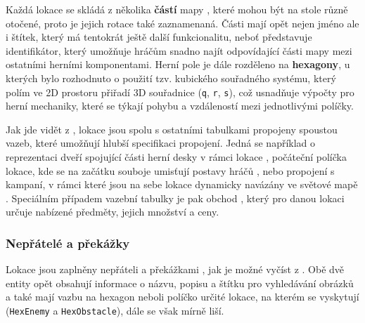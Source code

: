 Každá lokace se skládá z několika \textbf{částí} mapy , které mohou být na stole různě otočené, proto je jejich rotace  také zaznamenaná. Části mají opět nejen jméno ale i štítek, který má tentokrát ještě další funkcionalitu, neboť představuje identifikátor, který umožňuje hráčům snadno najít odpovídající části mapy mezi ostatními herními komponentami. Herní pole je dále rozděleno na \textbf{hexagony}, u kterých bylo rozhodnuto o použití tzv. kubického souřadného systému, který polím ve 2D prostoru přiřadí 3D souřadnice (\texttt{q}, \texttt{r}, \texttt{s}), což usnadňuje výpočty pro herní mechaniky, které se týkají pohybu a vzdáleností mezi jednotlivými políčky.

Jak jde vidět z , lokace jsou spolu s ostatními tabulkami propojeny spoustou vazeb, které umožňují hlubší specifikaci propojení. Jedná se například o reprezentaci dveří spojující části herní desky v rámci lokace , počáteční políčka lokace, kde se na začátku souboje umisťují postavy hráčů , nebo propojení s kampaní, v rámci které jsou na sebe lokace dynamicky navázány ve světové mapě . Speciálním případem vazební tabulky je pak obchod , který pro danou lokaci určuje nabízené předměty, jejich množství a ceny.

\subsubsection*{Nepřátelé a překážky}
\label{subsubsec:schema_enemy_obstacle}

Lokace jsou zaplněny nepřáteli  a překážkami , jak je možné vyčíst z . Obě dvě entity opět obsahují informace o názvu, popisu a štítku pro vyhledávání obrázků a také mají vazbu na hexagon neboli políčko určité lokace, na kterém se vyskytují (\texttt{HexEnemy} a \texttt{HexObstacle}), dále se však mírně liší.

